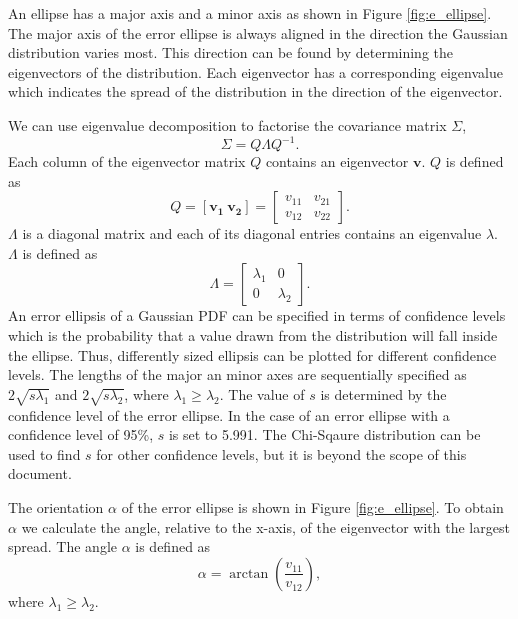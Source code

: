 \documentclass[12pt,oneside,openany,a4paper, %
afrikaans,english,
]{memoir}
\numberwithin{equation}{chapter}
\begin{document}
An ellipse has a major axis and a minor axis as shown in Figure \ref{fig:e_ellipse}. The major axis of the error ellipse is always aligned in the direction the Gaussian distribution varies most. This direction can be found by determining the eigenvectors of the distribution. Each eigenvector has a corresponding eigenvalue which indicates the spread of the distribution in the direction of the eigenvector. 

We can use eigenvalue decomposition to factorise the covariance matrix $\Sigma$,
\begin{equation}
\Sigma = Q\Lambda Q^{-1}.
\end{equation}
Each column of the eigenvector matrix $Q$ contains an eigenvector $\bm{v}$. $Q$ is defined as
\begin{equation}
Q =
[\bm{v_1} \ \bm{v_2}]
=
\begin{bmatrix}
v_{11} & v_{21}\\
v_{12} & v_{22}
\end{bmatrix}.
\end{equation}
$\Lambda$ is a diagonal matrix and each of its diagonal entries contains an eigenvalue $\lambda$. $\Lambda$ is defined as 
\begin{equation}
\Lambda =
\begin{bmatrix}
\lambda_1 & 0\\
0 & \lambda_2
\end{bmatrix}.
\end{equation}
An error ellipsis of a Gaussian PDF can be specified in terms of confidence levels which is the probability that a value drawn from the distribution will fall inside the ellipse. Thus, differently sized ellipsis can be plotted for different confidence levels. The lengths of the major an minor axes are sequentially specified as $2\sqrt{s\lambda_1}$ and $2\sqrt{s\lambda_2}$, where $\lambda_1 \geq \lambda_2$. The value of $s$ is determined by the confidence level of the error ellipse. In the case of an error ellipse with a confidence level of 95\%, $s$ is set to 5.991. The Chi-Sqaure distribution can be used to find $s$ for other confidence levels, but it is beyond the scope of this document.

The orientation $\alpha$ of the error ellipse is shown in Figure \ref{fig:e_ellipse}. To obtain $\alpha$ we calculate the angle, relative to the x-axis, of the eigenvector with the largest spread. The angle $\alpha$ is defined as
\begin{equation}
\alpha = \arctan\left(\frac{v_{11}}{v_{12}}\right),
\end{equation}
where $\lambda_1 \geq \lambda_2$.
\end{document}
